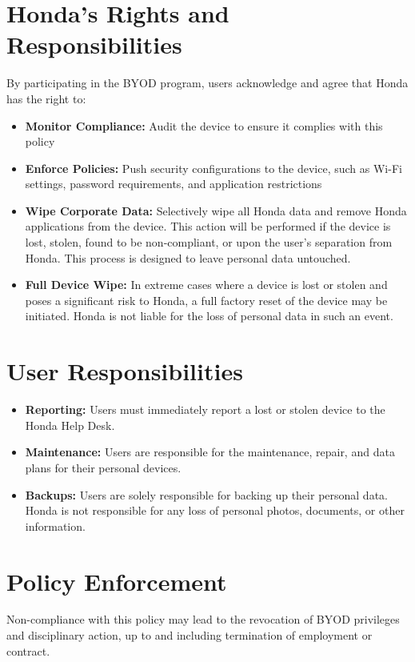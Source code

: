 \section{Honda's Rights and Responsibilities}
By participating in the BYOD program, users acknowledge and agree that Honda has the right to:
\begin{itemize}
    \item \textbf{Monitor Compliance:} Audit the device to ensure it complies with this policy
    \item \textbf{Enforce Policies:} Push security configurations to the device, such as Wi-Fi settings, password requirements, and application restrictions
    \item \textbf{Wipe Corporate Data:} Selectively wipe all Honda data and remove Honda applications from the device.  This action will be performed if the device is lost, stolen, found to be non-compliant, or upon the user's separation from Honda. This process is designed to leave personal data untouched.
    \item \textbf{Full Device Wipe:} In extreme cases where a device is lost or stolen and poses a significant risk to Honda, a full factory reset of the device may be initiated.  Honda is not liable for the loss of personal data in such an event.
\end{itemize}
\section{User Responsibilities}
\begin{itemize}
    \item \textbf{Reporting:} Users must immediately report a lost or stolen device to the Honda Help Desk.
    \item \textbf{Maintenance:} Users are responsible for the maintenance, repair, and data plans for their personal devices.
    \item \textbf{Backups:} Users are solely responsible for backing up their personal data. Honda is not responsible for any loss of personal photos, documents, or other information.
\end{itemize}
\section{Policy Enforcement} Non-compliance with this policy may lead to the revocation of BYOD privileges and disciplinary action, up to and including termination of employment or contract.


